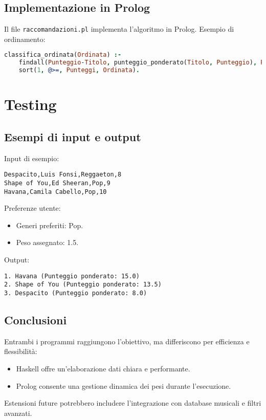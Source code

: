 \documentclass[a4paper,11pt]{article}
\begin{document}
\subsection{Implementazione in Prolog}
Il file \texttt{raccomandazioni.pl} implementa l'algoritmo in Prolog. Esempio di ordinamento:
\begin{lstlisting}[language=Prolog,caption=Ordinamento delle canzoni]
classifica_ordinata(Ordinata) :-
    findall(Punteggio-Titolo, punteggio_ponderato(Titolo, Punteggio), Punteggi),
    sort(1, @>=, Punteggi, Ordinata).
\end{lstlisting}

\section{Testing}
\subsection{Esempi di input e output}
Input di esempio:
\begin{verbatim}
Despacito,Luis Fonsi,Reggaeton,8
Shape of You,Ed Sheeran,Pop,9
Havana,Camila Cabello,Pop,10
\end{verbatim}
Preferenze utente:
\begin{itemize}
    \item Generi preferiti: Pop.
    \item Peso assegnato: 1.5.
\end{itemize}
Output:
\begin{verbatim}
1. Havana (Punteggio ponderato: 15.0)
2. Shape of You (Punteggio ponderato: 13.5)
3. Despacito (Punteggio ponderato: 8.0)
\end{verbatim}

\subsection{Conclusioni}
Entrambi i programmi raggiungono l'obiettivo, ma differiscono per efficienza e flessibilità:
\begin{itemize}
    \item Haskell offre un'elaborazione dati chiara e performante.
    \item Prolog consente una gestione dinamica dei pesi durante l'esecuzione.
\end{itemize}
Estensioni future potrebbero includere l'integrazione con database musicali e filtri avanzati.
\end{document}
